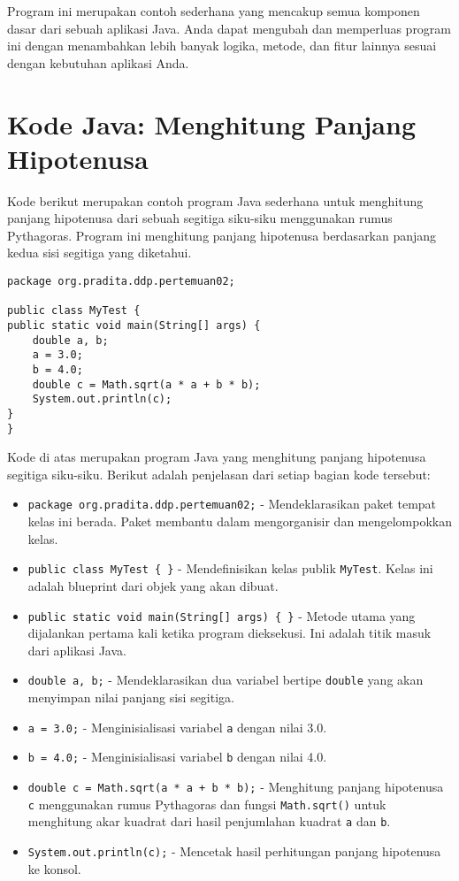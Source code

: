 Program ini merupakan contoh sederhana yang mencakup semua komponen dasar dari sebuah aplikasi Java. Anda dapat mengubah dan memperluas program ini dengan menambahkan lebih banyak logika, metode, dan fitur lainnya sesuai dengan kebutuhan aplikasi Anda.

\section{Kode Java: Menghitung Panjang Hipotenusa}

Kode berikut merupakan contoh program Java sederhana untuk menghitung panjang hipotenusa dari sebuah segitiga siku-siku menggunakan rumus Pythagoras. Program ini menghitung panjang hipotenusa berdasarkan panjang kedua sisi segitiga yang diketahui.

\begin{lstlisting}[style=JavaStyle, caption={Kode Java: MyTest.java}]
package org.pradita.ddp.pertemuan02;

public class MyTest {
public static void main(String[] args) {
	double a, b;
	a = 3.0;
	b = 4.0;
	double c = Math.sqrt(a * a + b * b);
	System.out.println(c);
}
}
\end{lstlisting}

Kode di atas merupakan program Java yang menghitung panjang hipotenusa segitiga siku-siku. Berikut adalah penjelasan dari setiap bagian kode tersebut:

\begin{itemize}
\item \texttt{package org.pradita.ddp.pertemuan02;} - Mendeklarasikan paket tempat kelas ini berada. Paket membantu dalam mengorganisir dan mengelompokkan kelas.
\item \texttt{public class MyTest \{ \}} - Mendefinisikan kelas publik \texttt{MyTest}. Kelas ini adalah blueprint dari objek yang akan dibuat.
\item \texttt{public static void main(String[] args) \{ \}} - Metode utama yang dijalankan pertama kali ketika program dieksekusi. Ini adalah titik masuk dari aplikasi Java.
\item \texttt{double a, b;} - Mendeklarasikan dua variabel bertipe \texttt{double} yang akan menyimpan nilai panjang sisi segitiga.
\item \texttt{a = 3.0;} - Menginisialisasi variabel \texttt{a} dengan nilai 3.0.
\item \texttt{b = 4.0;} - Menginisialisasi variabel \texttt{b} dengan nilai 4.0.
\item \texttt{double c = Math.sqrt(a * a + b * b);} - Menghitung panjang hipotenusa \texttt{c} menggunakan rumus Pythagoras dan fungsi \texttt{Math.sqrt()} untuk menghitung akar kuadrat dari hasil penjumlahan kuadrat \texttt{a} dan \texttt{b}.
\item \texttt{System.out.println(c);} - Mencetak hasil perhitungan panjang hipotenusa ke konsol.
\end{itemize}


